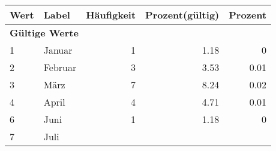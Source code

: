      \begin{longtable}{lXrrr}
     \toprule
     \textbf{Wert} & \textbf{Label} & \textbf{Häufigkeit} & \textbf{Prozent(gültig)} & \textbf{Prozent} \\
     \endhead
     \midrule
     \multicolumn{5}{l}{\textbf{Gültige Werte}}\\

     1 &
     \multicolumn{1}{X}{ Januar   } &


       \num{1} &
       \num[round-mode=places,round-precision=2]{1.18} &
         \num[round-mode=places,round-precision=2]{0} \\

     2 &
     \multicolumn{1}{X}{ Februar   } &


       \num{3} &
       \num[round-mode=places,round-precision=2]{3.53} &
         \num[round-mode=places,round-precision=2]{0.01} \\

     3 &
     \multicolumn{1}{X}{ März   } &


       \num{7} &
       \num[round-mode=places,round-precision=2]{8.24} &
         \num[round-mode=places,round-precision=2]{0.02} \\

     4 &
     \multicolumn{1}{X}{ April   } &


       \num{4} &
       \num[round-mode=places,round-precision=2]{4.71} &
         \num[round-mode=places,round-precision=2]{0.01} \\

     6 &
     \multicolumn{1}{X}{ Juni   } &


       \num{1} &
       \num[round-mode=places,round-precision=2]{1.18} &
         \num[round-mode=places,round-precision=2]{0} \\

     7 &
     \multicolumn{1}{X}{ Juli   } &



\end{longtable}
